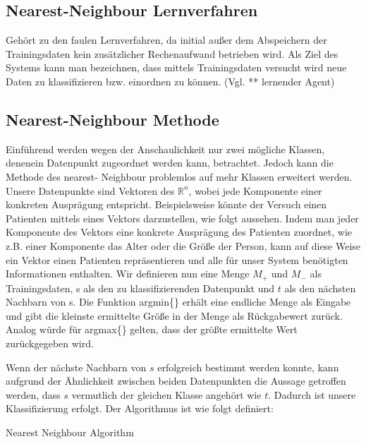 \documentclass[a4paper]{scrartcl}
\begin{document}
\begin{multicols}{2}
        \section{Nearest-Neighbour Lernverfahren}
            Gehört zu den faulen Lernverfahren, da initial außer dem Abspeichern der Trainingsdaten kein zusätzlicher Rechenaufwand betrieben wird. Als Ziel des Systems kann man bezeichnen, dass mittels Trainingsdaten versucht wird neue Daten zu klassifizieren bzw. einordnen zu können. (Vgl. ** lernender Agent)
                        
            \subsection{Nearest-Neighbour Methode}
                Einführend werden wegen der Anschaulichkeit nur zwei mögliche Klassen, denenein Datenpunkt zugeordnet werden kann, betrachtet. Jedoch kann die Methode des nearest- Neighbour problemlos auf mehr Klassen erweitert werden.
                Unsere Datenpunkte sind Vektoren des $\mathbb{R}^n$, wobei jede Komponente einer konkreten Ausprägung entspricht. 
                Beispielsweise könnte der Versuch einen Patienten mittels eines Vektors darzustellen, wie folgt aussehen. Indem man jeder Komponente des Vektors eine konkrete Ausprägung des Patienten zuordnet, wie z.B. einer Komponente das Alter oder die Größe der Person, kann auf diese Weise ein Vektor einen Patienten repräsentieren und alle für unser System benötigten Informationen enthalten.
                Wir definieren nun eine Menge $M_+$ und $M_-$ als Trainingsdaten, s als den zu klassifizierenden Datenpunkt und $t$ als den nächsten Nachbarn von s. Die Funktion argmin\{\} erhält eine endliche Menge als Eingabe und gibt die kleinste ermittelte Größe in der Menge als Rückgabewert zurück. Analog würde für argmax\{\} gelten, dass der größte ermittelte Wert zurückgegeben wird.
                        
                Wenn der nächste Nachbarn von $s$ erfolgreich bestimmt werden konnte, kann aufgrund der Ähnlichkeit zwischen beiden Datenpunkten die Aussage getroffen werden, dass $s$ vermutlich der gleichen Klasse angehört wie $t$. Dadurch ist unsere Klassifizierung erfolgt.
                Der Algorithmus ist wie folgt definiert:
                \begin{algorithm}[H]
                        {
                            \KwRet{-}\;
                        }
                    \caption{Nearest Neighbour Algorithm}
                \end{algorithm}
                        

\end{multicols}
\end{document}

